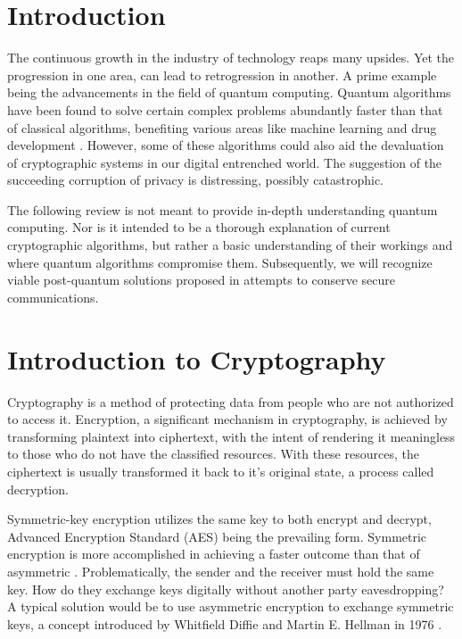 \section{Introduction}
The continuous growth in the industry of technology reaps many upsides. 
Yet the progression in one area, can lead to retrogression in another.
A prime example being the advancements in the field of quantum computing.
Quantum algorithms have been found to solve certain complex problems abundantly faster than that of classical algorithms, benefiting various areas like machine learning and drug development \cite{Q_Comp_Real}. 
However, some of these algorithms could also aid the devaluation of cryptographic systems in our digital entrenched world. The suggestion of the succeeding corruption of privacy is distressing, possibly catastrophic. 



The following review is not meant to provide in-depth understanding quantum computing. Nor is it intended to be a thorough explanation of current cryptographic algorithms, but rather a basic understanding of their workings and where quantum algorithms compromise them.
Subsequently, we will recognize viable post-quantum solutions proposed in attempts to conserve secure communications.

\section{Introduction to Cryptography}
Cryptography is a method of protecting data from people who are not authorized to access it. Encryption, a significant mechanism in cryptography, is achieved by transforming plaintext into ciphertext, with the intent of rendering it meaningless to those who do not have the classified resources. With these resources, the ciphertext is usually transformed it back to it's original state, a process called decryption.

Symmetric-key encryption utilizes the same key to both encrypt and decrypt, Advanced Encryption Standard (AES) being the prevailing form. Symmetric encryption is more accomplished in achieving a faster outcome than that of asymmetric \cite{Understanding_Cryptog}. Problematically, the sender and the receiver must hold the same key. How do they exchange keys digitally without another party eavesdropping? A typical solution would be to use asymmetric encryption to exchange symmetric keys, a concept introduced by Whitfield Diffie and Martin E. Hellman in 1976 \cite{PKC}.


